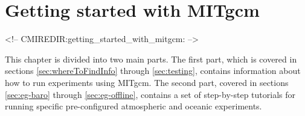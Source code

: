 
\chapter[Getting Started with MITgcm]{Getting started with MITgcm}
\label{chap:getting_started}

\begin{rawhtml}
<!-- CMIREDIR:getting_started_with_mitgcm: -->
\end{rawhtml}

This chapter is divided into two main parts. The first part, which is
covered in sections \ref{sec:whereToFindInfo} through
\ref{sec:testing}, contains information about how to run experiments
using MITgcm. The second part, covered in sections
\ref{sec:eg-baro} through \ref{sec:eg-offline}, contains a set of
step-by-step tutorials for running specific pre-configured atmospheric
and oceanic experiments.



\newpage


\newpage


